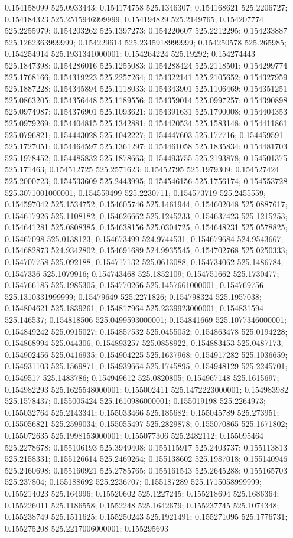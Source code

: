 0.154158099 525.0933443; 0.154174758 525.1346307; 0.154168621 525.2206727; 0.154184323 525.2515946999999; 0.154194829 525.2149765; 0.154207774 525.2255979; 0.154203262 525.1397273; 0.154220607 525.2212295; 0.154233887 525.1262363999999; 0.154229614 525.2345918999999; 0.154250578 525.265985; 0.154254914 525.1931341000001; 0.154264224 525.19292; 0.154274443 525.1847398; 0.154286016 525.1255083; 0.154288424 525.2118501; 0.154299774 525.1768166; 0.154319223 525.2257264; 0.154322141 525.2105652; 0.154327959 525.1887228; 0.154345894 525.1118033; 0.154343901 525.1106469; 0.154351251 525.0863205; 0.154356448 525.1189556; 0.154359014 525.0997257; 0.154390898 525.0974987; 0.154376901 525.1093621; 0.154391631 525.1790008; 0.154404353 525.0979269; 0.154404815 525.1342881; 0.154420534 525.1583148; 0.154411861 525.0796821; 0.154443028 525.1042227; 0.154447603 525.177716; 0.154459591 525.1727051; 0.154464597 525.1361297; 0.154461058 525.1835834; 0.154481703 525.1978452; 0.154485832 525.1878663; 0.154493755 525.2193878; 0.154501375 525.171463; 0.154512725 525.2571623; 0.15452795 525.1979309; 0.154527424 525.2000723; 0.154533609 525.2443995; 0.154546156 525.1756174; 0.154553728 525.3071001000001; 0.154559499 525.2230711; 0.154573719 525.2455559; 0.154597042 525.1534752; 0.154605746 525.1461944; 0.154602048 525.0887617; 0.154617926 525.1108182; 0.154626662 525.1245233; 0.154637423 525.1215253; 0.154641281 525.0808385; 0.154638156 525.0304725; 0.154648231 525.0578825; 0.15467098 525.0138123; 0.154673499 524.9744531; 0.154679684 524.9543667; 0.154682873 524.9342802; 0.154691689 524.9935545; 0.154702768 525.0250333; 0.154707758 525.092188; 0.154717132 525.0613088; 0.154734062 525.1486784; 0.1547336 525.1079916; 0.154743468 525.1852109; 0.154751662 525.1730477; 0.154766185 525.1985305; 0.154770266 525.1457661000001; 0.154769756 525.1310331999999; 0.15479649 525.2271826; 0.154798324 525.1957038; 0.154804621 525.1839261; 0.154817964 525.2339923000001; 0.154831594 525.146537; 0.154818506 525.0499593000001; 0.154841669 525.1077346000001; 0.154849242 525.0915027; 0.154857532 525.0455052; 0.154863478 525.0194228; 0.154868994 525.044306; 0.154893257 525.0858922; 0.154883453 525.0487173; 0.154902456 525.0416935; 0.154904225 525.1637968; 0.154917282 525.1036659; 0.154931103 525.1569871; 0.154939664 525.1745895; 0.154948129 525.2245701; 0.1549517 525.1483786; 0.154949612 525.0820805; 0.154967148 525.1615697; 0.154982293 525.1625548000001; 0.155002411 525.1472223000001; 0.154983982 525.1578437; 0.155005424 525.1610986000001; 0.155019198 525.2264973; 0.155032764 525.2143341; 0.155033466 525.185682; 0.155045789 525.273951; 0.155056821 525.2599034; 0.155055497 525.2829878; 0.155070865 525.1671802; 0.155072635 525.1998153000001; 0.155077306 525.2482112; 0.155095464 525.2278678; 0.155106193 525.3949408; 0.155115917 525.2403737; 0.155113813 525.2158331; 0.155126614 525.2469264; 0.155138602 525.1987018; 0.155140946 525.2460698; 0.155160921 525.2785765; 0.155161543 525.2645288; 0.155165703 525.237804; 0.155188692 525.2236707; 0.155187289 525.1715058999999; 0.155214023 525.164996; 0.15520602 525.1227245; 0.155218694 525.1686364; 0.155226011 525.1186558; 0.1552248 525.1642679; 0.155237745 525.1074348; 0.155238749 525.1511625; 0.155250243 525.1921491; 0.155271095 525.1776731; 0.155275208 525.2217006000001; 0.155295693 